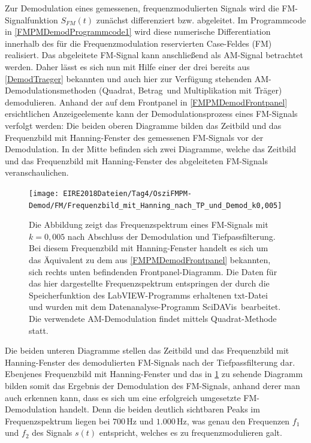 \documentclass[
a4paper,
12pt,
pagesize,
ngerman
]{scrartcl}
\begin{document}
	Zur Demodulation eines gemessenen, frequenzmodulierten Signals wird die FM-Signalfunktion $S_{FM}(t)$ zunächst differenziert bzw. abgeleitet.
	Im Programmcode in \cref{FMPMDemodProgrammcode1} wird diese numerische Differentiation innerhalb des für die Frequenzmodulation reservierten Case-Feldes (\glqq FM\grqq ) realisiert.
	Das abgeleitete FM-Signal kann anschließend als AM-Signal betrachtet werden.
	Daher lässt es sich nun mit Hilfe einer der drei bereits aus \cref{DemodTraeger} bekannten und auch hier zur Verfügung stehenden AM-Demodulationsmethoden (\glqq Quadrat\grqq , \glqq Betrag\grqq\ und \glqq Multiplikation mit Träger\grqq ) demodulieren.
	Anhand der auf dem Frontpanel in \cref{FMPMDemodFrontpanel} ersichtlichen Anzeigeelemente kann der Demodulationsprozess eines FM-Signals verfolgt werden:
	Die beiden oberen Diagramme bilden das Zeitbild und das Frequenzbild mit Hanning-Fenster des gemessenen FM-Signals vor der Demodulation.
	In der Mitte befinden sich zwei Diagramme, welche das Zeitbild und das Frequenzbild mit Hanning-Fenster des abgeleiteten FM-Signals veranschaulichen.
		
	\begin{figure}[H] %
		\centering
		\texttt{[image: EIRE2018Dateien/Tag4/OsziFMPM-Demod/FM/Frequenzbild\_mit\_Hanning\_nach\_TP\_und\_Demod\_k0,005]}
		\caption{Die Abbildung zeigt das Frequenzspektrum eines FM-Signals mit $k=0,005$ nach Abschluss der Demodulation und Tiefpassfilterung. Bei diesem Frequenzbild mit Hanning-Fenster handelt es sich um das Äquivalent zu dem aus \cref{FMPMDemodFrontpanel} bekannten, sich rechts unten befindenden Frontpanel-Diagramm. Die Daten für das hier dargestellte Frequenzspektrum entspringen der durch die Speicherfunktion des LabVIEW-Programms erhaltenen txt-Datei und wurden mit dem Datenanalyse-Programm \glqq SciDAVis\grqq\ bearbeitet. Die verwendete AM-Demodulation findet mittels \glqq Quadrat\grqq -Methode statt.}
		\label{FMDiagramm}
	\end{figure}
	
	\noindent Die beiden unteren Diagramme stellen das Zeitbild und das Frequenzbild mit Hanning-Fenster des demodulierten FM-Signals nach der Tiefpassfilterung dar.
	Ebenjenes Frequenzbild mit Hanning-Fenster und das in \cref{FMDiagramm} zu sehende Diagramm bilden somit das Ergebnis der Demodulation des FM-Signals, anhand derer man auch erkennen kann, dass es sich um eine erfolgreich umgesetzte FM-Demodulation handelt.
	Denn die beiden deutlich sichtbaren Peaks im Frequenzspektrum liegen bei $700\,$Hz und $1.000\,$Hz, was genau den Frequenzen $f_1$ und $f_2$ des Signals $s(t)$ entspricht, welches es zu frequenzmodulieren galt.
	
\end{document}
